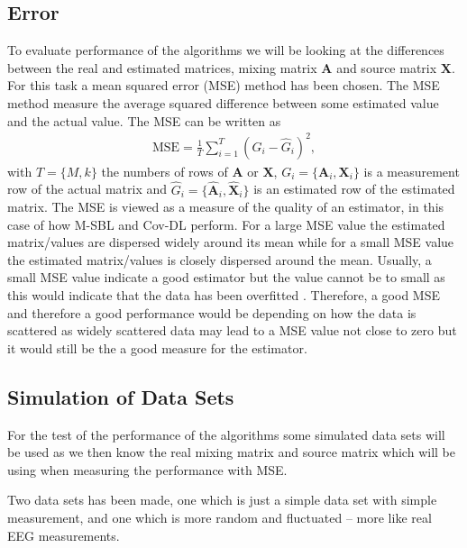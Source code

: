 \subsection{Error}
To evaluate performance of the algorithms we will be looking at the differences between the real and estimated matrices, mixing matrix $\mathbf{A}$ and source matrix $\mathbf{X}$.
For this task a mean squared error (MSE) method has been chosen. 
The MSE method measure the average squared difference between some estimated value and the actual value. 
The MSE can be written as
\begin{align*}
\text{MSE} = \frac{1}{T} \sum_{i=1}^T (G_i - \hat{G}_i)^2,  
\end{align*}
with $T = \{M, k\}$ the numbers of rows of $\mathbf{A}$ or $\mathbf{X}$, $G_i = \{ \mathbf{A}_i, \mathbf{X}_i\}$ is a measurement row of the actual matrix and $\hat{G}_i = \{\hat{\mathbf{A}}_i,\hat{\mathbf{X}}_i\}$ is an estimated row of the estimated matrix.
The MSE is viewed as a measure of the quality of an estimator, in this case of how M-SBL and Cov-DL perform. 
For a large MSE value the estimated matrix/values are dispersed widely around its mean while for a small MSE value the estimated matrix/values is closely dispersed around the mean. 
Usually, a small MSE value indicate a good estimator but the value cannot be to small as this would indicate that the data has been overfitted . 
Therefore, a good MSE and therefore a good performance would be depending on how the data is scattered as widely scattered data may lead to a MSE value not close to zero but it would still be the a good measure for the estimator.

\subsection{Simulation of Data Sets}
For the test of the performance of the algorithms some simulated data sets will be used as we then know the real mixing matrix and source matrix which will be using when measuring the performance with MSE.

Two data sets has been made, one which is just a simple data set with simple measurement, and one which is more random and fluctuated -- more like real EEG measurements.

